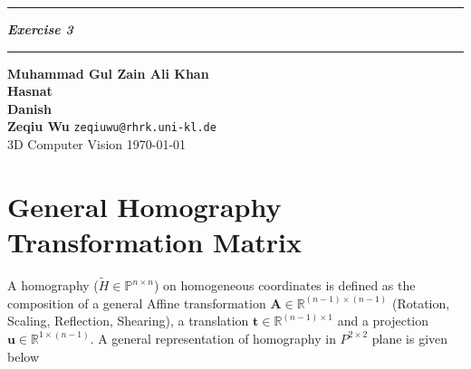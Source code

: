 \documentclass{article}
\newcommand{\squishlist}{
 \begin{list}{$\bullet$}
  { \setlength{\itemsep}{0pt}
     \setlength{\parsep}{3pt}
     \setlength{\topsep}{3pt}
     \setlength{\partopsep}{0pt}
     \setlength{\leftmargin}{1.5em}
     \setlength{\labelwidth}{1em}
     \setlength{\labelsep}{0.5em} } }
\newcommand{\squishend}{
  \end{list}  }
\begin{document}
 \def\maketitle{%
 \thispagestyle{plain}
 \vspace{-10ex}
 \hrule
 \bigskip
 \begin{center}
 {\Large{\textbf{\@title}}}
 \end{center}
 \bigskip
 \hrule

 \bigskip

 \begin{flushleft}
 \textbf{\normalsize{Muhammad Gul Zain Ali Khan}} 
 \\
 \vspace{5pt}
 \textbf{\normalsize{Hasnat}} 
 \\
 \vspace{5pt}
 \textbf{\normalsize{Danish}}
 \\
\vspace{5pt}
 \textbf{\normalsize{Zeqiu Wu}} \hfill \texttt{zeqiuwu@rhrk.uni-kl.de}
 \\
 \vspace{5pt}
 3D Computer Vision \vspace{5pt}
\hfill \today \\ 
 \end{flushleft}
 }
\def\title#1{\def\@title{#1}}
\title{\textit{Exercise 3}}



\maketitle

\section{General Homography Transformation Matrix}
A homography ($\tilde{H} \in \mathbb{P}^{n \times n}$) on homogeneous coordinates is defined as the composition of a general Affine transformation $\mathbf{A} \in \mathbb{R}^{(n - 1) \times (n - 1)}$ (Rotation, Scaling, Reflection, Shearing), a translation $\mathbf{t} \in \mathbb{R}^{(n - 1) \times 1}$ and a projection $\mathbf{u} \in \mathbb{R}^{1 \times (n - 1)}$. A general representation of homography in \(P^{2\times2}\) plane is given below
\end{document}
